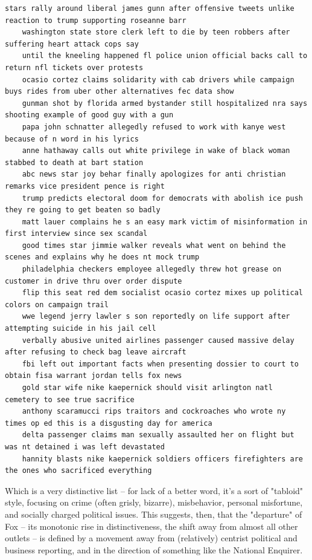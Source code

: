 \documentclass{scrartcl}
\begin{document}
\begin{lstlisting}[basicstyle=\tiny\hlfont]
    stars rally around liberal james gunn after offensive tweets unlike reaction to trump supporting roseanne barr
    washington state store clerk left to die by teen robbers after suffering heart attack cops say
    until the kneeling happened fl police union official backs call to return nfl tickets over protests
    ocasio cortez claims solidarity with cab drivers while campaign buys rides from uber other alternatives fec data show
    gunman shot by florida armed bystander still hospitalized nra says shooting example of good guy with a gun
    papa john schnatter allegedly refused to work with kanye west because of n word in his lyrics
    anne hathaway calls out white privilege in wake of black woman stabbed to death at bart station
    abc news star joy behar finally apologizes for anti christian remarks vice president pence is right
    trump predicts electoral doom for democrats with abolish ice push they re going to get beaten so badly
    matt lauer complains he s an easy mark victim of misinformation in first interview since sex scandal
    good times star jimmie walker reveals what went on behind the scenes and explains why he does nt mock trump
    philadelphia checkers employee allegedly threw hot grease on customer in drive thru over order dispute
    flip this seat red dem socialist ocasio cortez mixes up political colors on campaign trail
    wwe legend jerry lawler s son reportedly on life support after attempting suicide in his jail cell
    verbally abusive united airlines passenger caused massive delay after refusing to check bag leave aircraft
    fbi left out important facts when presenting dossier to court to obtain fisa warrant jordan tells fox news
    gold star wife nike kaepernick should visit arlington natl cemetery to see true sacrifice
    anthony scaramucci rips traitors and cockroaches who wrote ny times op ed this is a disgusting day for america
    delta passenger claims man sexually assaulted her on flight but was nt detained i was left devastated
    hannity blasts nike kaepernick soldiers officers firefighters are the ones who sacrificed everything
\end{lstlisting}

Which is a very distinctive list -- for lack of a better word, it's a sort of "tabloid" style, focusing on crime (often grisly, bizarre), misbehavior, personal misfortune, and socially charged political issues. This suggests, then, that the "departure" of Fox -- its monotonic rise in distinctiveness, the shift away from almost all other outlets -- is defined by a movement away from (relatively) centrist political and business reporting, and in the direction of something like the National Enquirer.
\end{document}
